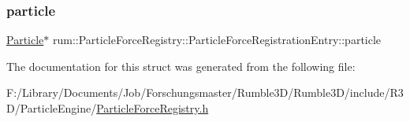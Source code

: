 \subsubsection{\texorpdfstring{particle}{particle}}
{\footnotesize\ttfamily \hyperlink{classrum_1_1_particle}{Particle}$\ast$ rum\+::\+Particle\+Force\+Registry\+::\+Particle\+Force\+Registration\+Entry\+::particle}



The documentation for this struct was generated from the following file\+:\begin{DoxyCompactItemize}
\item 
F\+:/\+Library/\+Documents/\+Job/\+Forschungsmaster/\+Rumble3\+D/\+Rumble3\+D/include/\+R3\+D/\+Particle\+Engine/\hyperlink{_particle_force_registry_8h}{Particle\+Force\+Registry.\+h}\end{DoxyCompactItemize}
